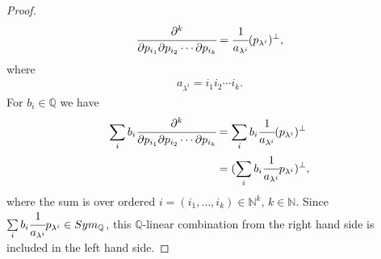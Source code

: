 \documentclass[8pt]{extarticle}
\newcommand{\N}{\mathbb{N}}
\newcommand{\Q}{\mathbb{Q}}
\newcommand{\<}{\langle}
\renewcommand{\>}{\rangle}
\theoremstyle{definition}
\begin{document}
\begin{proof}
  \begin{align*}
    \cfrac{\partial^k}{\partial p_{i_1} \partial p_{i_2} \cdots \partial p_{i_k}} = \cfrac{1}{a_{\lambda^i}} (p_{\lambda^i})^{\perp},
  \end{align*}
  where
  \begin{align*}
    a_{\lambda^i} = i_1 i_2 \cdots i_k.
  \end{align*}
  For $b_{i} \in \Q$ we have
  \begin{align*}
    \sum\limits_{i} b_{i}\cfrac{\partial^k}{\partial p_{i_1} \partial p_{i_2} \cdots \partial p_{i_k}}
    &=
    \sum\limits_{i} b_{i}\cfrac{1}{a_{\lambda^i}} (p_{\lambda^i})^{\perp} \\
    &=
    (\sum\limits_{i} b_{i}\cfrac{1}{a_{\lambda^i}}p_{\lambda^i})^{\perp},
  \end{align*}
  where the sum is over ordered $i=(i_1, \dots, i_k) \in \N^k$, $k \in \N$. Since $\sum\limits_{i} b_{i}\cfrac{1}{a_{\lambda^i}}p_{\lambda^i} \in Sym_{\Q}$, this $\Q$-linear combination from the right hand side is included in the left hand side.
\end{proof}
\end{document}

